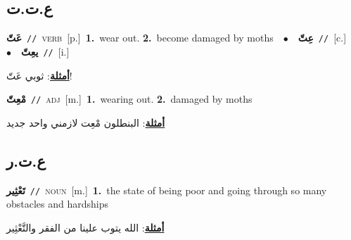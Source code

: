 \documentclass[10pt,a4paper,twoside]{article} %
\begin{document}
\begin{multicols}{2}
\vspace{-3mm}
\subsection*{\color{blue}\foreignlanguage{arabic}{ع.ت.ت}\color{blue}{}} 

{\setlength\topsep{0pt}\textbf{\foreignlanguage{arabic}{عَتّ}}\ {\color{gray}\texttt{//}\color{black}}\ \textsc{verb}\ [p.]\ \textbf{1.}~wear out.  \textbf{2.}~become damaged by moths\ \ $\bullet$\ \ \setlength\topsep{0pt}\textbf{\foreignlanguage{arabic}{عِتّ}}\ {\color{gray}\texttt{//}\color{black}}\ [c.]\ \ $\bullet$\ \ \setlength\topsep{0pt}\textbf{\foreignlanguage{arabic}{يعِتّ}}\ {\color{gray}\texttt{//}\color{black}}\ [i.]\  \begin{flushright}\color{gray}\foreignlanguage{arabic}{\textbf{\underline{\foreignlanguage{arabic}{أمثلة}}}: ثوبي عَتّ!}\end{flushright}\color{black}} \vspace{2mm}

{\setlength\topsep{0pt}\textbf{\foreignlanguage{arabic}{مْعِتّ}}\ {\color{gray}\texttt{//}\color{black}}\ \textsc{adj}\ [m.]\ \textbf{1.}~wearing out.  \textbf{2.}~damaged by moths\  \begin{flushright}\color{gray}\foreignlanguage{arabic}{\textbf{\underline{\foreignlanguage{arabic}{أمثلة}}}: البنطلون مْعِت لازمني واحد جديد}\end{flushright}\color{black}} \vspace{2mm}

\vspace{-3mm}
\subsection*{\color{blue}\foreignlanguage{arabic}{ع.ت.ر}\color{blue}{}} 

{\setlength\topsep{0pt}\textbf{\foreignlanguage{arabic}{تَعْثِير}}\ {\color{gray}\texttt{//}\color{black}}\ \textsc{noun}\ [m.]\ \textbf{1.}~the state of being poor and going through so many obstacles and hardships\  \begin{flushright}\color{gray}\foreignlanguage{arabic}{\textbf{\underline{\foreignlanguage{arabic}{أمثلة}}}: الله يتوب علينا من الفقر والتَّعْثِير}\end{flushright}\color{black}} \vspace{2mm}


\end{multicols}
\end{document}
